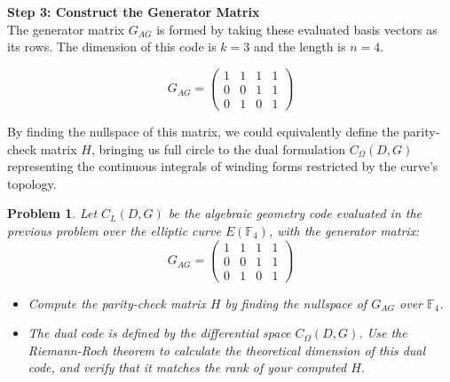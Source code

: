 \documentclass[11pt]{article}
\newtheorem{problem}{Problem}
\begin{document}
\begin{mdframed}[backgroundcolor=gray!5, linecolor=gray!50, linewidth=1pt]
		\vspace{0.3cm}
		\textbf{Step 3: Construct the Generator Matrix} \\
		The generator matrix $G_{AG}$ is formed by taking these evaluated basis vectors as its rows. The dimension of this code is $k=3$ and the length is $n=4$.
		
		$$
		G_{AG} = \begin{pmatrix}
			1 & 1 & 1 & 1 \\
			0 & 0 & 1 & 1 \\
			0 & 1 & 0 & 1
		\end{pmatrix}
		$$
		
		By finding the nullspace of this matrix, we could equivalently define the parity-check matrix $H$, bringing us full circle to the dual formulation $C_\Omega(D, G)$ representing the continuous integrals of winding forms restricted by the curve's topology.
	\end{mdframed}

	\newpage
		\begin{problem}
			Let $C_L(D, G)$ be the algebraic geometry code evaluated in the previous problem over the elliptic curve $E(\mathbb{F}_4)$, with the generator matrix:
			$$
			G_{AG} = \begin{pmatrix}
				1 & 1 & 1 & 1 \\
				0 & 0 & 1 & 1 \\
				0 & 1 & 0 & 1
			\end{pmatrix}
			$$
			\begin{itemize}
				\item[(a)] Compute the parity-check matrix $H$ by finding the nullspace of $G_{AG}$ over $\mathbb{F}_4$.
				\item[(b)] The dual code is defined by the differential space $C_\Omega(D, G)$. Use the Riemann-Roch theorem to calculate the theoretical dimension of this dual code, and verify that it matches the rank of your computed $H$.
			\end{itemize}
		\end{problem}
		
		\vspace{0.5cm}
		
\end{document}
